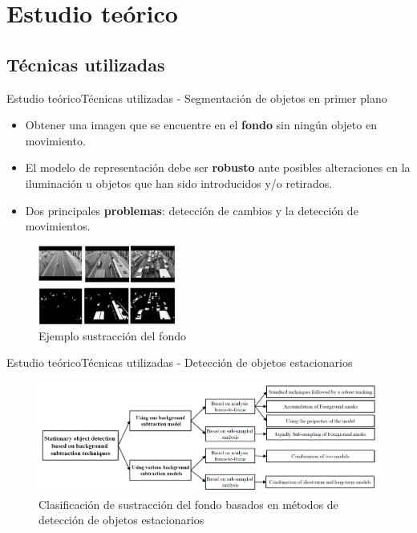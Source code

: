 \section{Estudio teórico}

\subsection{Técnicas utilizadas}

\begin{frame}{Estudio teórico}{Técnicas utilizadas - Segmentación de objetos en primer plano}

\begin{itemize}
    \justifying
    \item Obtener una imagen que se encuentre en el \textbf{fondo} sin ningún objeto en movimiento.
    \item El modelo de representación debe ser \textbf{robusto} ante posibles alteraciones en la iluminación u objetos que han sido introducidos y/o retirados.
    \item Dos principales \textbf{problemas}: detección de cambios y la detección de movimientos.
\end{itemize}


\begin{figure}[ht]
\centering
\includegraphics[width=0.4\textwidth]{Images/estudio-teorico/background-subtraction-example.jpg}
\caption{\label{fig:background-subtraction-example}Ejemplo sustracción del fondo}
\end{figure}

\end{frame}


\begin{frame}{Estudio teórico}{Técnicas utilizadas - Detección de objetos estacionarios}

\begin{figure}[ht]
\centering
\includegraphics[width=1\textwidth]{Images/estudio-teorico/metodos-sustraccion-fondo-deteccion-fondo-estacionario.png}
\caption{\label{fig:metodos-sustraccion-fondo-deteccion-fondo-estacionario}Clasificación de sustracción del fondo basados en métodos de detección de objetos estacionarios}
\end{figure}

\end{frame}

